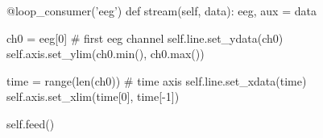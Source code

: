 \begin{python}
@loop_consumer('eeg')
def stream(self, data):
    eeg, aux = data

    ch0 = eeg[0]  # first eeg channel
    self.line.set_ydata(ch0)
    self.axis.set_ylim(ch0.min(), ch0.max())

    time = range(len(ch0))  # time axis
    self.line.set_xdata(time)
    self.axis.set_xlim(time[0], time[-1])

    self.feed()
\end{python}